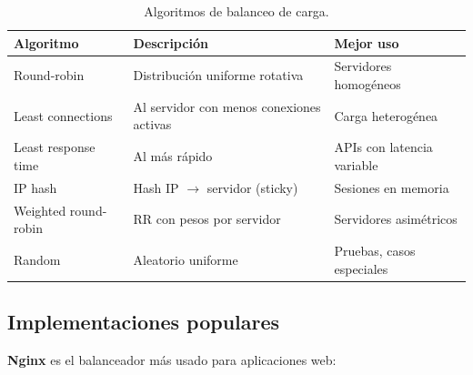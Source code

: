\documentclass[11pt,a4paper,openany]{book}
\begin{document}
\begin{table}[htbp]
\centering
\caption{Algoritmos de balanceo de carga.}
\footnotesize
\begin{tabularx}{\textwidth}{lXX}
\toprule
\textbf{Algoritmo} & \textbf{Descripción} & \textbf{Mejor uso}\\
\midrule
Round-robin & Distribución uniforme rotativa & Servidores homogéneos\\
Least connections & Al servidor con menos conexiones activas & Carga heterogénea\\
Least response time & Al más rápido & APIs con latencia variable\\
IP hash & Hash IP $\to$ servidor (sticky) & Sesiones en memoria\\
Weighted round-robin & RR con pesos por servidor & Servidores asimétricos\\
Random & Aleatorio uniforme & Pruebas, casos especiales\\
\bottomrule
\end{tabularx}
\end{table}

\subsection{Implementaciones populares}

\textbf{Nginx} es el balanceador más usado para aplicaciones web:
\end{document}
